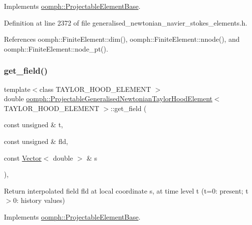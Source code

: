 Implements \hyperlink{classoomph_1_1ProjectableElementBase_a644306ebdf16f334344c2d27d72f18b7}{oomph\+::\+Projectable\+Element\+Base}.



Definition at line 2372 of file generalised\+\_\+newtonian\+\_\+navier\+\_\+stokes\+\_\+elements.\+h.



References oomph\+::\+Finite\+Element\+::dim(), oomph\+::\+Finite\+Element\+::nnode(), and oomph\+::\+Finite\+Element\+::node\+\_\+pt().

\mbox{\label{classoomph_1_1ProjectableGeneralisedNewtonianTaylorHoodElement_aa43386b75da4ae4c4b1dd89d335de0db}} 
\subsubsection{\texorpdfstring{get\+\_\+field()}{get\_field()}}
{\footnotesize\ttfamily template$<$class T\+A\+Y\+L\+O\+R\+\_\+\+H\+O\+O\+D\+\_\+\+E\+L\+E\+M\+E\+NT $>$ \\
double \hyperlink{classoomph_1_1ProjectableGeneralisedNewtonianTaylorHoodElement}{oomph\+::\+Projectable\+Generalised\+Newtonian\+Taylor\+Hood\+Element}$<$ T\+A\+Y\+L\+O\+R\+\_\+\+H\+O\+O\+D\+\_\+\+E\+L\+E\+M\+E\+NT $>$\+::get\+\_\+field (\begin{DoxyParamCaption}\item[{const unsigned \&}]{t,  }\item[{const unsigned \&}]{fld,  }\item[{const \hyperlink{classoomph_1_1Vector}{Vector}$<$ double $>$ \&}]{s }\end{DoxyParamCaption})\hspace{0.3cm}{\ttfamily [inline]}, {\ttfamily [virtual]}}



Return interpolated field fld at local coordinate s, at time level t (t=0\+: present; t$>$0\+: history values) 



Implements \hyperlink{classoomph_1_1ProjectableElementBase_ae4da5b565b6d333be2f5920f7be763cd}{oomph\+::\+Projectable\+Element\+Base}.



